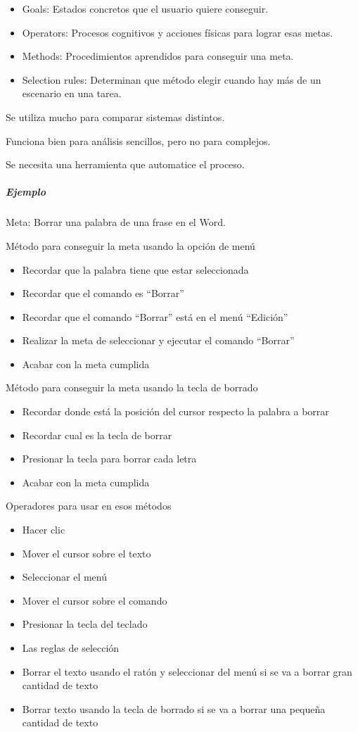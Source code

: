 \documentclass[12pt, twoside, openright]{report} %
\begin{document}
\begin{itemize}
	\item Goals: Estados concretos que el usuario quiere conseguir.
	\item Operators: Procesos cognitivos y acciones físicas para lograr
	      esas metas.
	\item Methods: Procedimientos aprendidos para conseguir una meta.
	\item Selection rules: Determinan que método elegir cuando hay más
	      de un escenario en una tarea.
\end{itemize}

Se utiliza mucho para comparar sistemas distintos.

Funciona bien para análisis sencillos, pero no para complejos.

Se necesita una herramienta que automatice el proceso.
\subparagraph{Ejemplo}

Meta: Borrar una palabra de una frase en el Word.

Método para conseguir la meta usando la opción de menú
\begin{itemize}
	\item Recordar que la palabra tiene que estar seleccionada
	\item Recordar que el comando es “Borrar”
	\item Recordar que el comando “Borrar” está en el menú “Edición”
	\item Realizar la meta de seleccionar y ejecutar el comando “Borrar”
	\item Acabar con la meta cumplida
\end{itemize}
Método para conseguir la meta usando la tecla de borrado
\begin{itemize}
	\item Recordar donde está la posición del cursor respecto la palabra a borrar
	\item Recordar cual es la tecla de borrar
	\item Presionar la tecla para borrar cada letra
	\item Acabar con la meta cumplida
\end{itemize}
Operadores para usar en esos métodos
\begin{itemize}
	\item Hacer clic
	\item Mover el cursor sobre el texto
	\item Seleccionar el menú
	\item Mover el cursor sobre el comando
	\item Presionar la tecla del teclado
	\item Las reglas de selección
	\item Borrar el texto usando el ratón y seleccionar del menú si se va a borrar gran cantidad de texto
	\item Borrar texto usando la tecla de borrado si se va a borrar una pequeña cantidad de texto
\end{itemize}
\end{document}
